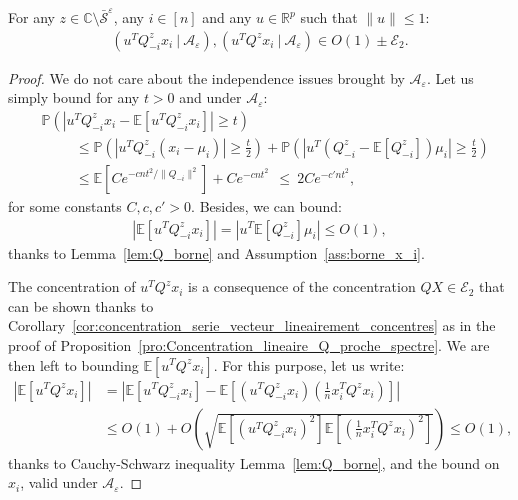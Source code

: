 \documentclass{ws-rmta}
\begin{document}
\begin{lemma}\label{lem:uQx}
  For any $z \in \mathbb C \setminus \bar{\mathcal S}^\varepsilon$, any $i \in [n]$ and any $u \in \mathbb R^p$ such that $\|u\|\leq 1$:
  \begin{align*}
    (u^T Q_{-i}^zx_i \ | \ \mathcal A_\varepsilon),
    (u^T Q^zx_i \ | \ \mathcal A_\varepsilon)
     \in O(1) \pm \mathcal E_2.
  \end{align*}
\end{lemma}
\begin{proof}
    We do not care about the independence issues brought by $\mathcal A_\varepsilon$. Let us simply bound for any $t>0$ and under $\mathcal A_\varepsilon$:
    \begin{align*}
      &\mathbb P \left( \left\vert u^T Q_{-i}^zx_i - \mathbb E \left[  u^T Q_{-i}^zx_i\right] \right\vert \geq t \right)\\
      &\hspace{1cm}\leq \mathbb P \left( \left\vert u^T Q_{-i}^z(x_i -\mu_i) \right\vert \geq \frac{t}{2} \right)+
      \mathbb P \left( \left\vert u^T  \left( Q_{-i}^z-\mathbb E \left[ Q_{-i}^z\right] \right)\mu_i \right\vert \geq \frac{t}{2} \right)\\
      &\hspace{1cm}\leq \mathbb E \left[ C e^{-cnt^2/\|Q_{-i}\|^2} \right] + C e^{-cnt^2} \ \
      \leq \ 2C e^{-c'nt^2},
    \end{align*}
    for some constants $C,c,c'>0$. Besides, we can bound:
    \begin{align*}
      \left\vert \mathbb E \left[  u^T Q_{-i}^zx_i\right] \right\vert = \left\vert u^T \mathbb E[Q_{-i}^z]\mu_i \right\vert \leq O(1),
    \end{align*}
    thanks to Lemma~\ref{lem:Q_borne} and Assumption~\ref{ass:borne_x_i}.

    The concentration of $u^T Q^zx_i$ is a consequence of the concentration $QX \in \mathcal E_2$ that can be shown thanks to Corollary~\ref{cor:concentration_serie_vecteur_lineairement_concentres} as in the proof of Proposition~\ref{pro:Concentration_lineaire_Q_proche_spectre}.
    We are then left to bounding $\mathbb E[u^T Q^zx_i]$. For this purpose, let us write:
    \begin{align*}
      \left\vert \mathbb E[u^T Q^zx_i]  \right\vert
      &= \left\vert \mathbb E[u^T Q_{-i}^zx_i] - \mathbb E \left[   (u^T Q_{-i}^zx_i) \left( \frac{1}{n} x_i^TQ^zx_i \right) \right] \right\vert \\
      &\leq O(1) + O \left( \sqrt{\mathbb E \left[   (u^T Q_{-i}^zx_i)^2 \right]\mathbb E \left[ \left( \frac{1}{n} x_i^TQ^zx_i \right)^2 \right]} \right) \leq O(1),
    \end{align*}
    thanks to Cauchy-Schwarz inequality Lemma~\ref{lem:Q_borne}, and the bound on $x_i$, valid under $\mathcal A_\varepsilon$.
\end{proof}
\end{document}
